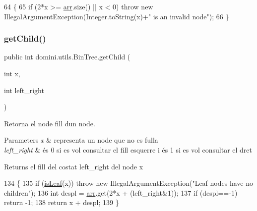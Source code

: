 \begin{DoxyCode}
64                                   \{
65         \textcolor{keywordflow}{if} (2*x >= \hyperlink{classdomini_1_1utils_1_1BinTree_a357bcbcf07ba7fcb99d11b237d189e65}{arr}.size() || x < 0) \textcolor{keywordflow}{throw} \textcolor{keyword}{new} IllegalArgumentException(Integer.toString(x)+\textcolor{stringliteral}{" is an
       invalid node"});
66     \}
\end{DoxyCode}
\mbox{\label{classdomini_1_1utils_1_1BinTree_aee1ed36b9433869f94a6ee8a6815d872}} 
\subsubsection{\texorpdfstring{get\+Child()}{getChild()}}
{\footnotesize\ttfamily public int domini.\+utils.\+Bin\+Tree.\+get\+Child (\begin{DoxyParamCaption}\item[{int}]{x,  }\item[{int}]{left\+\_\+right }\end{DoxyParamCaption})\hspace{0.3cm}{\ttfamily [inline]}}



Retorna el node fill d\textquotesingle{}un node. 


\begin{DoxyParams}{Parameters}
{\em x} & representa un node que no es fulla \\
\hline
{\em left\+\_\+right} & és 0 si es vol consultar el fill esquerre i és 1 si es vol consultar el dret \\
\hline
\end{DoxyParams}
\begin{DoxyReturn}{Returns}
el fill del costat left\+\_\+right del node x 
\end{DoxyReturn}

\begin{DoxyCode}
134                                                \{
135         \textcolor{keywordflow}{if} (\hyperlink{classdomini_1_1utils_1_1BinTree_a37030e961f5613a5c74984ac002d965b}{isLeaf}(x)) \textcolor{keywordflow}{throw} \textcolor{keyword}{new} IllegalArgumentException(\textcolor{stringliteral}{"Leaf nodes have no children"});
136         \textcolor{keywordtype}{int} despl = \hyperlink{classdomini_1_1utils_1_1BinTree_a357bcbcf07ba7fcb99d11b237d189e65}{arr}.get(2*x + (left\_right&1));
137         \textcolor{keywordflow}{if} (despl==-1) \textcolor{keywordflow}{return} -1;
138         \textcolor{keywordflow}{return} x + despl;
139     \}
\end{DoxyCode}
\mbox{\label{classdomini_1_1utils_1_1BinTree_ad8734786aa8ba40815e4b782264aef64}} 

